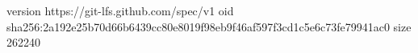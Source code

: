 version https://git-lfs.github.com/spec/v1
oid sha256:2a192e25b70d66b6439cc80e8019f98eb9f46af597f3cd1c5e6c73fe79941ac0
size 262240
